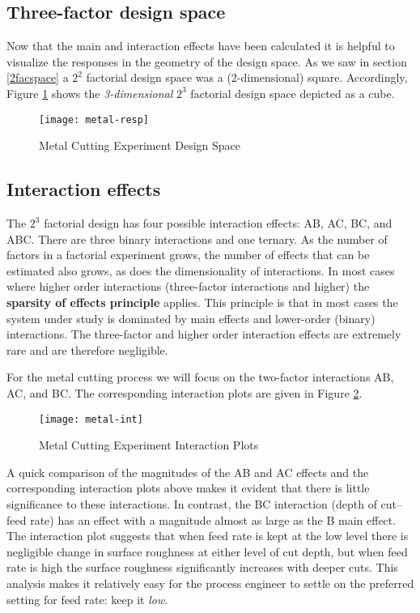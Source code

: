 \subsection{Three-factor design space}\label{DesignSpace}
Now that the main and interaction effects have been calculated it is helpful to visualize the responses in the geometry of the design space.  As we saw in section \ref{2facspace} a $2^{2}$ factorial design space was a (2-dimensional) square.  Accordingly, Figure \ref{fig6} shows the \textit{3-dimensional} $2^{3}$ factorial design space depicted as a cube.
\begin{figure}[h]\caption{Metal Cutting Experiment Design Space}\label{fig6}
\begin{center}
\texttt{[image: metal-resp]}
\end{center}
\end{figure}
\subsection{Interaction effects}
The $2^{3}$ factorial design has four possible interaction effects: AB, AC, BC, and ABC.  There are three binary interactions and one ternary.  As the number of factors in a factorial experiment grows, the number of effects that can be estimated also grows, as does the dimensionality of interactions.  In most cases where higher order interactions (three-factor interactions and higher) the \textbf{sparsity of effects principle} applies. This principle is that in most cases the system under study is dominated by main effects and lower-order (binary) interactions.  The three-factor and higher order interaction effects are extremely rare and are therefore negligible.\label{sparsity}

For the metal cutting process we will focus on the two-factor interactions AB, AC, and BC.  The corresponding interaction plots are given in Figure \ref{fig7}.
\begin{figure}[h]\caption{Metal Cutting Experiment Interaction Plots}\label{fig7}
\begin{center}
\texttt{[image: metal-int]}
\end{center}
\end{figure}
A quick comparison of the magnitudes of the AB and AC effects and the corresponding interaction plots above makes it evident that there is little significance to these interactions. In contrast, the BC interaction (depth of cut--feed rate) has an effect with a magnitude almost as large as the B main effect.  The interaction plot suggests that when feed rate is kept at the low level there is negligible change in surface roughness at either level of cut depth, but when feed rate is high the surface roughness significantly increases with deeper cuts.  This analysis makes it relatively easy for the process engineer to settle on the preferred setting for feed rate:  keep it \textit{low}.

